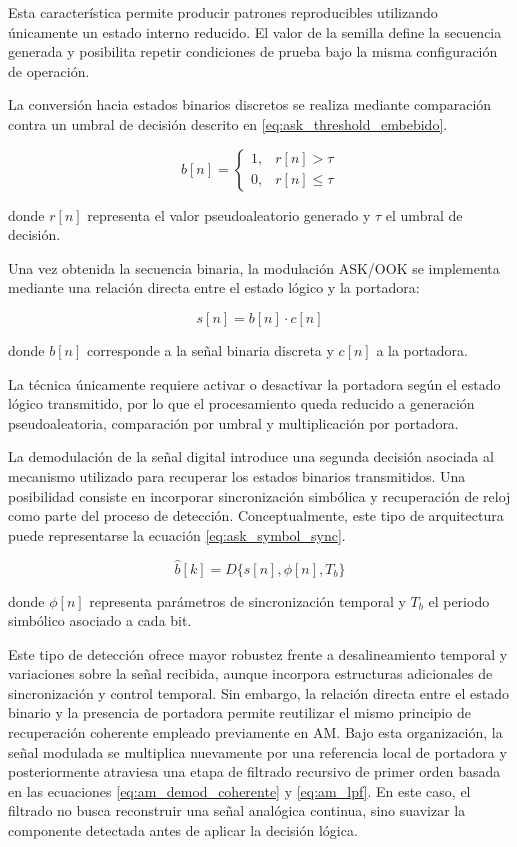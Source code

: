 Esta característica permite producir patrones reproducibles utilizando únicamente un estado interno reducido. El valor de la semilla define la secuencia generada y posibilita repetir condiciones de prueba bajo la misma configuración de operación.

La conversión hacia estados binarios discretos se realiza mediante comparación contra un umbral de decisión descrito en \eqref{eq:ask_threshold_embebido}.

\begin{equation}
b[n] =
\begin{cases}
1, & r[n] > \tau \\
0, & r[n] \leq \tau
\end{cases}
\label{eq:ask_threshold_embebido}
\end{equation}

donde $r[n]$ representa el valor pseudoaleatorio generado y $\tau$ el umbral de decisión.

Una vez obtenida la secuencia binaria, la modulación ASK/OOK se implementa mediante una relación directa entre el estado lógico y la portadora:

\begin{equation}
s[n] = b[n] \cdot c[n]
\label{eq:ask_mod_embebido}
\end{equation}

donde $b[n]$ corresponde a la señal binaria discreta y $c[n]$ a la portadora.

La técnica únicamente requiere activar o desactivar la portadora según el estado lógico transmitido, por lo que el procesamiento queda reducido a generación pseudoaleatoria, comparación por umbral y multiplicación por portadora.

La demodulación de la señal digital introduce una segunda decisión asociada al mecanismo utilizado para recuperar los estados binarios transmitidos. Una posibilidad consiste en incorporar sincronización simbólica y recuperación de reloj como parte del proceso de detección. Conceptualmente, este tipo de arquitectura puede representarse la ecuación \eqref{eq:ask_symbol_sync}.

\begin{equation}
\hat{b}[k] = D\{s[n], \phi[n], T_b\}
\label{eq:ask_symbol_sync}
\end{equation}

donde $\phi[n]$ representa parámetros de sincronización temporal y $T_b$ el periodo simbólico asociado a cada bit.

Este tipo de detección ofrece mayor robustez frente a desalineamiento temporal y variaciones sobre la señal recibida, aunque incorpora estructuras adicionales de sincronización y control temporal. Sin embargo, la relación directa entre el estado binario y la presencia de portadora permite reutilizar el mismo principio de recuperación coherente empleado previamente en AM. Bajo esta organización, la señal modulada se multiplica nuevamente por una referencia local de portadora y posteriormente atraviesa una etapa de filtrado recursivo de primer orden basada en las ecuaciones \ref{eq:am_demod_coherente} y \ref{eq:am_lpf}. En este caso, el filtrado no busca reconstruir una señal analógica continua, sino suavizar la componente detectada antes de aplicar la decisión lógica.

